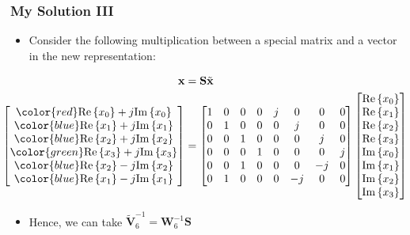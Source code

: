 \documentclass{beamer}
\begin{document}
\begin{frame}
\frametitle{My Solution III}
\begin{itemize}
    \item Consider the following multiplication between a special matrix and a vector in the new representation:
    
    \begin{align*}
        \mathbf{x} &= \mathbf{S}\tilde{\mathbf{x}} \\
        \hspace{-25pt}
        \begin{bmatrix}
		{\color{red}\mathrm{Re}\left\{x_0\right\} + j\mathrm{Im}\left\{x_0\right\}} \\
		{\color{blue}\mathrm{Re}\left\{x_1\right\} + j\mathrm{Im}\left\{x_1\right\}} \\
		{\color{blue}\mathrm{Re}\left\{x_2\right\} + j\mathrm{Im}\left\{x_2\right\}} \\
		{\color{green}\mathrm{Re}\left\{x_3\right\} + j\mathrm{Im}\left\{x_3\right\}} \\
		{\color{blue}\mathrm{Re}\left\{x_2\right\} - j\mathrm{Im}\left\{x_2\right\}} \\
		{\color{blue}\mathrm{Re}\left\{x_1\right\} - j\mathrm{Im}\left\{x_1\right\}} 
        \end{bmatrix}
        &=
        \begin{bmatrix}
            1 & 0 & 0 & 0 & j & 0 & 0 & 0 \\ 
            0 & 1 & 0 & 0 & 0 & j & 0 & 0 \\ 
            0 & 0 & 1 & 0 & 0 & 0 & j & 0 \\ 
            0 & 0 & 0 & 1 & 0 & 0 & 0 & j \\ 
            0 & 0 & 1 & 0 & 0 & 0 & -j & 0 \\ 
            0 & 1 & 0 & 0 & 0 & -j & 0 & 0  
        \end{bmatrix}
        \begin{bmatrix}
            \mathrm{Re}\left\{x_0\right\} \\
            \mathrm{Re}\left\{x_1\right\} \\
            \mathrm{Re}\left\{x_2\right\} \\
            \mathrm{Re}\left\{x_3\right\} \\
            \mathrm{Im}\left\{x_0\right\} \\
            \mathrm{Im}\left\{x_1\right\} \\
            \mathrm{Im}\left\{x_2\right\} \\
            \mathrm{Im}\left\{x_3\right\} 
        \end{bmatrix}
    \end{align*}
    \item Hence, we can take $\tilde{\mathbf{V}}^{-1}_6 = \mathbf{W}^{-1}_6\mathbf{S}$
\end{itemize}
\end{frame}
\end{document}
